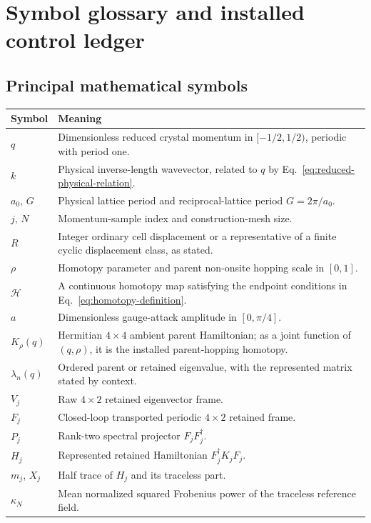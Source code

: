 \section{Symbol glossary and installed control ledger}

\subsection{Principal mathematical symbols}

\begin{longtable}{@{}p{}p{}@{}}
\toprule
Symbol & Meaning\\
\midrule
\endhead
$q$ & Dimensionless reduced crystal momentum in $[-1/2,1/2)$, periodic with period one.\\
$k$ & Physical inverse-length wavevector, related to $q$ by Eq.~\eqref{eq:reduced-physical-relation}.\\
$a_0$, $G$ & Physical lattice period and reciprocal-lattice period $G=2\pi/a_0$.\\
$j$, $N$ & Momentum-sample index and construction-mesh size.\\
$R$ & Integer ordinary cell displacement or a representative of a finite cyclic displacement class, as stated.\\
$\rho$ & Homotopy parameter and parent non-onsite hopping scale in $[0,1]$.\\
$\mathcal H$ & A continuous homotopy map satisfying the endpoint conditions in Eq.~\eqref{eq:homotopy-definition}.\\
$a$ & Dimensionless gauge-attack amplitude in $[0,\pi/4]$.\\
$K_\rho(q)$ & Hermitian $4\times4$ ambient parent Hamiltonian; as a joint function of $(q,\rho)$, it is the installed parent-hopping homotopy.\\
$\lambda_n(q)$ & Ordered parent or retained eigenvalue, with the represented matrix stated by context.\\
$V_j$ & Raw $4\times2$ retained eigenvector frame.\\
$F_j$ & Closed-loop transported periodic $4\times2$ retained frame.\\
$P_j$ & Rank-two spectral projector $F_jF_j^\dagger$.\\
$H_j$ & Represented retained Hamiltonian $F_j^\dagger K_jF_j$.\\
$m_j$, $X_j$ & Half trace of $H_j$ and its traceless part.\\
$\kappa_N$ & Mean normalized squared Frobenius power of the traceless reference field.\\

\end{longtable}
